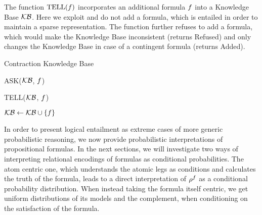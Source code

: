 The function $\mathrm{TELL}(f)$ incorporates an additional formula $f$ into a Knowledge Base $\mathcal{KB}$.
Here we exploit  and do not add a formula, which is entailed in order to maintain a sparse representation. %
The function further refuses to add a formula, which would make the Knowledge Base inconsistent (returns Refused) and only changes the Knowledge Base in case of a contingent formula (returns Added).

\begin{algorithm}[hbt!]
\caption{Contraction Knowledge Base}\label{alg:contractionKB}
ASK($\mathcal{KB}$, $f$)
\begin{algorithmic}
	\State{$\hypercoreat{\formulavar} \algdefsymbol \contractionof{\{\secexformulaat{\shortcatvariables} \, : \, \secexformula\in\kb\},\rencodingofat{\exformula}{\formulavar,\shortcatvariables}}{\formulavar}$}
	\EndIf
	\EndIf
	\EndIf
\end{algorithmic}
TELL($\mathcal{KB}$, $f$)
\begin{algorithmic}
	\EndIf
	\EndIf
	\EndIf
		\State $\mathcal{KB} \leftarrow \mathcal{KB}\cup\{f\}$
	\EndIf
\end{algorithmic}

\end{algorithm}





In order to present logical entailment as extreme cases of more generic probabilistic reasoning, we now provide probabilistic interpretations of propositional formulas.
In the next sections, we will investigate two ways of interpreting relational encodings of formulas as conditional probabilities.
The atom centric one, which understands the atomic legs as conditions and calculates the truth of the formula, leads to a direct interpretation of $\rho^{f}$ as a conditional probability distribution.
When instead taking the formula itself centric, we get uniform distributions of its models and the complement, when conditioning on the satisfaction of the formula.


